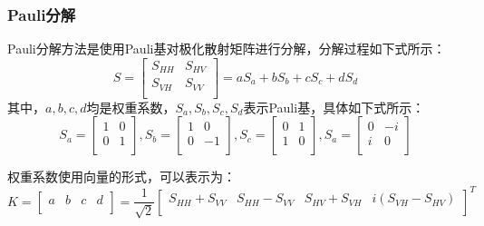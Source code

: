 \subsubsection{Pauli分解}
Pauli分解方法是使用Pauli基对极化散射矩阵进行分解，分解过程如下式所示：
\begin{equation}
    S=\left[ \begin{matrix}
            S_{HH} & S_{HV} \\
            S_{VH} & S_{VV} \\
        \end{matrix} \right] =aS_a+bS_b+cS_c+dS_d
\end{equation}
其中，$a,b,c,d$均是权重系数，$S_a,S_b,S_c,S_d$表示Pauli基，具体如下式所示：
\begin{equation}
    S_a=\left[ \begin{matrix}
            1 & 0 \\
            0 & 1 \\
        \end{matrix} \right] ,S_b=\left[ \begin{matrix}
            1 & 0  \\
            0 & -1 \\
        \end{matrix} \right] ,S_c=\left[ \begin{matrix}
            0 & 1 \\
            1 & 0 \\
        \end{matrix} \right] ,S_a=\left[ \begin{matrix}
            0 & -i \\
            i & 0  \\
        \end{matrix} \right]
\end{equation}

权重系数使用向量的形式，可以表示为：
\begin{equation}
    K=\left[ \begin{matrix}
            a & b & c & d \\
        \end{matrix} \right] =\frac{1}{\sqrt{2}}\left[ \begin{matrix}
            S_{HH}+S_{VV} & S_{HH}-S_{VV} & S_{HV}+S_{VH} & i\left( S_{VH}-S_{HV} \right) \\
        \end{matrix} \right] ^T
\end{equation}

